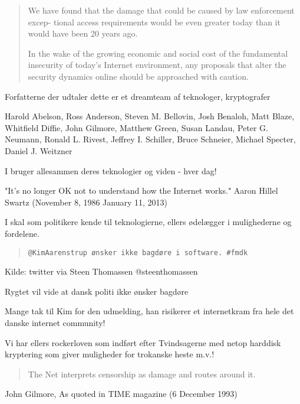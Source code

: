 \documentclass[20pt,landscape,a4paper,footrule]{foils}
\begin{document}
\begin{quote}
We have found that the damage that could be caused by law enforcement excep-
tional access requirements would be even greater today than it would have been 20
years ago.

In the wake of the growing economic and social cost of the fundamental
insecurity of today’s Internet environment, any proposals that alter the security dynamics online should be approached with caution.
\end{quote}

Forfatterne der udtaler dette er et dreamteam af teknologer, kryptografer

Harold Abelson, Ross Anderson, Steven M. Bellovin, Josh Benaloh, Matt Blaze,
Whitfield Diffie, John Gilmore, Matthew Green, Susan Landau, Peter G. Neumann,
Ronald L. Rivest, Jeffrey I. Schiller, Bruce Schneier, Michael Specter, Daniel J. Weitzner

I bruger allesammen deres teknologier og viden - hver dag!




"It's no longer OK not to understand how the Internet works."
Aaron Hillel Swartz (November 8, 1986  January 11, 2013)

I skal som politikere kende til teknologierne, ellers ødelægger i mulighederne og fordelene.





\begin{quote}
\verb+@KimAarenstrup ønsker ikke bagdøre i software. #fmdk+
\end{quote}
Kilde: twitter via Steen Thomassen @steenthomassen\\

Rygtet vil vide at dansk politi ikke ønsker bagdøre

Mange tak til Kim for den udmelding, han risikerer et internetkram
fra hele det danske internet community!

Vi har ellers rockerloven som indført efter Tvindsagerne med netop
harddisk kryptering som giver muligheder for trokanske heste m.v.!



\begin{quote}
  The Net interprets censorship as damage and routes around it.
\end{quote}
John Gilmore, As quoted in TIME magazine (6 December 1993)
\end{document}
